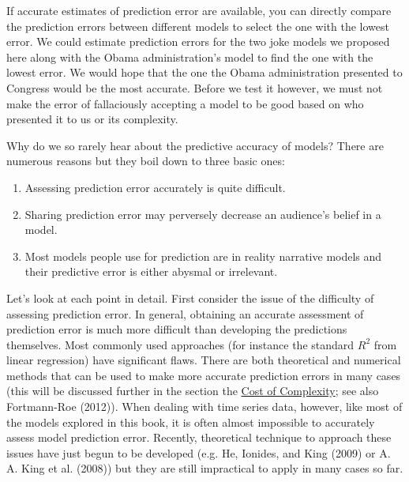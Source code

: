 \documentclass[]{memoir}
\begin{document}
If accurate estimates of prediction error are available, you can
directly compare the prediction errors between different models to
select the one with the lowest error. We could estimate prediction
errors for the two joke models we proposed here along with the Obama
administration's model to find the one with the lowest error. We would
hope that the one the Obama administration presented to Congress would
be the most accurate. Before we test it however, we must not make the
error of fallaciously accepting a model to be good based on who
presented it to us or its complexity.

Why do we so rarely hear about the predictive accuracy of models? There
are numerous reasons but they boil down to three basic ones:

\begin{enumerate}
\def\labelenumi{\arabic{enumi}.}
\itemsep1pt\parskip0pt
\item
  Assessing prediction error accurately is quite difficult.
\item
  Sharing prediction error may perversely decrease an audience's belief
  in a model.
\item
  Most models people use for prediction are in reality narrative models
  and their predictive error is either abysmal or irrelevant.
\end{enumerate}

Let's look at each point in detail. First consider the issue of the
difficulty of assessing prediction error. In general, obtaining an
accurate assessment of prediction error is much more difficult than
developing the predictions themselves. Most commonly used approaches
(for instance the standard $R^2$ from linear regression) have
significant flaws. There are both theoretical and numerical methods that
can be used to make more accurate prediction errors in many cases (this
will be discussed further in the section the
\hyperref[ComplexityCost]{Cost of Complexity}; see also Fortmann-Roe
(2012)). When dealing with time series data, however, like most of the
models explored in this book, it is often almost impossible to
accurately assess model prediction error. Recently, theoretical
technique to approach these issues have just begun to be developed (e.g.
He, Ionides, and King (2009) or A. A. King et al. (2008)) but they are
still impractical to apply in many cases so far.
\end{document}
